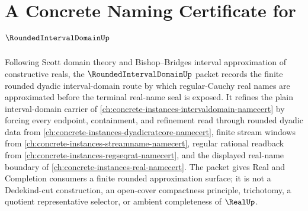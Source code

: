 \chapter{A Concrete Naming Certificate for $\RoundedIntervalDomainUp$}
\label{ch:concrete-instances-rounded-interval-domain-namecert}

Following Scott domain theory and Bishop--Bridges interval approximation of constructive reals, the $\RoundedIntervalDomainUp$ packet records the finite rounded dyadic interval-domain route by which regular-Cauchy real names are approximated before the terminal real-name seal is exposed. It refines the plain interval-domain carrier of \autoref{ch:concrete-instances-intervaldomain-namecert} by forcing every endpoint, containment, and refinement read through rounded dyadic data from \autoref{ch:concrete-instances-dyadicratcore-namecert}, finite stream windows from \autoref{ch:concrete-instances-streamname-namecert}, regular rational readback from \autoref{ch:concrete-instances-regseqrat-namecert}, and the displayed real-name boundary of \autoref{ch:concrete-instances-real-namecert}. The packet gives Real and Completion consumers a finite rounded approximation surface; it is not a Dedekind-cut construction, an open-cover compactness principle, trichotomy, a quotient representative selector, or ambient completeness of $\RealUp$.

